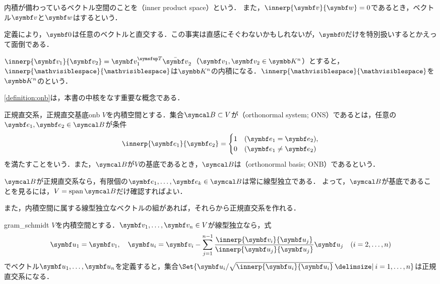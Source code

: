 \documentclass[../../main]{subfiles}
\begin{document}
内積が備わっているベクトル空間のことを（inner product space）という．
また，\(\innerp{\vect{v}}{\vect{w}}=0\)であるとき，ベクトル\(\vect{v}\)と\(\vect{w}\)はするという．

\begin{note}
  定義により，\(\zvec\)は任意のベクトルと直交する．この事実は直感にそぐわないかもしれないが，\(\zvec\)だけを特別扱いするとかえって面倒である．
\end{note}

\begin{example}[標準内積]
  \(\innerp{\vect{v}_1}{\vect{v}_2}=\trps{\vect{v}_1}\conj{\vect{v}}_2\)（\(\vect{v}_1,\vect{v}_2\in\numset{K}^n\)）とすると，
  \(\innerp{\holder}{\holder}\)は\(\numset{K}^n\)の内積になる．\(\innerp{\holder}{\holder}\)を\(\numset{K}^n\)のという．
\end{example}

\cref{definition:onb}は，本書の中核をなす重要な概念である．

\begin{definition}{正規直交系，正規直交基底}{onb}
  \(V\)を内積空間とする．集合\(\basis{B}\subset V\)が（orthonormal system; ONS）であるとは，任意の\(\vect{e}_1,\vect{e}_2\in\basis{B}\)が条件
  \[
    \innerp{\vect{e}_1}{\vect{e}_2} = \begin{cases}1 & (\vect{e}_1=\vect{e}_2),\\ 0 & (\vect{e}_1\neq\vect{e}_2)\end{cases}
  \]
  を満たすことをいう．また，\(\basis{B}\)が\(V\)の基底であるとき，\(\basis{B}\)は（orthonormal basis; ONB）であるという．
\end{definition}

\(\basis{B}\)が正規直交系なら，有限個の\(\vect{e}_1,\dots,\vect{e}_k\in\basis{B}\)は常に線型独立である．
よって，\(\basis{B}\)が基底であることを見るには，\(V=\spannedby\basis{B}\)だけ確認すればよい．

また，内積空間に属する線型独立なベクトルの組があれば，それらから正規直交系を作れる．

\begin{proposition}{}{gram_schmidt}
  \(V\)を内積空間とする．\(\vect{v}_1,\dots,\vect{v}_n\in V\)が線型独立なら，式
  \[
    \vect{u}_1 = \vect{v}_1,
    \quad\vect{u}_i = \vect{v}_i-\sum_{j=1}^{n-1}\frac{\innerp{\vect{v}_i}{\vect{u}_j}}{\innerp{\vect{u}_j}{\vect{u}_j}}\vect{u}_j\quad(i=2,\dots,n)
  \]
  でベクトル\(\vect{u}_1,\dots,\vect{u}_n\)を定義すると，集合\(\Set{\vect{u}_i/\sqrt{\innerp{\vect{u}_i}{\vect{u}_i}}\given i=1,\dots,n}\)は正規直交系になる．
\end{proposition}
\end{document}
